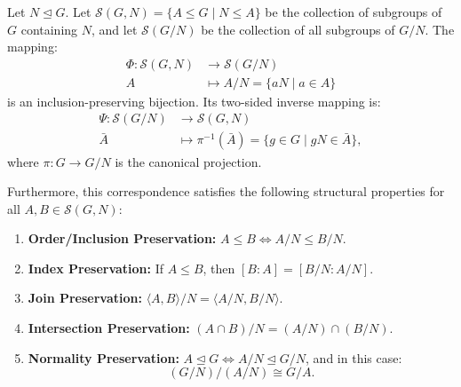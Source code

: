 \begin{theorem}
\label{thm:lattice_iso}
Let $N \trianglelefteq G$. Let $\mathcal{S}(G, N) = \{ A \le G \mid N \le A \}$ be the collection of subgroups of $G$ containing $N$, and let $\mathcal{S}(G/N)$ be the collection of all subgroups of $G/N$.
The mapping:
\begin{align}
\Phi: \mathcal{S}(G, N) &\longrightarrow \mathcal{S}(G/N) \\
A &\longmapsto A/N = \{ aN \mid a \in A \}
\end{align}
is an inclusion-preserving bijection. Its two-sided inverse mapping is:
\begin{align}
\Psi: \mathcal{S}(G/N) &\longrightarrow \mathcal{S}(G, N) \\
\bar{A} &\longmapsto \pi^{-1}(\bar{A}) = \{ g \in G \mid gN \in \bar{A} \},
\end{align}
where $\pi: G \to G/N$ is the canonical projection.

Furthermore, this correspondence satisfies the following structural properties for all $A, B \in \mathcal{S}(G, N)$:
\begin{enumerate}[label=\textbf{(\roman*)}, leftmargin=*, itemsep=4pt]
    \item \textbf{Order/Inclusion Preservation:} $A \le B \iff A/N \le B/N$.
    \item \textbf{Index Preservation:} If $A \le B$, then $[B : A] = [B/N : A/N]$.
    \item \textbf{Join Preservation:} $\langle A, B \rangle / N = \langle A/N, B/N \rangle$.
    \item \textbf{Intersection Preservation:} $(A \cap B)/N = (A/N) \cap (B/N)$.
    \item \textbf{Normality Preservation:} $A \trianglelefteq G \iff A/N \trianglelefteq G/N$, and in this case:
    \begin{equation}
    (G/N)/(A/N) \cong G/A.
    \end{equation}
\end{enumerate}
\end{theorem}

